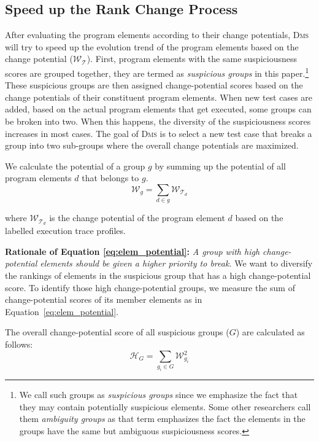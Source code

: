 \subsection{Speed up the Rank Change Process}

After evaluating the program elements according to their change potentials, \textsc{Dms} will try to speed up the evolution trend of the program elements based on the change potential ($\mathcal{W}_{\mathcal{T}}$). First, program elements with the same suspiciousness scores are grouped together, they are termed as {\em suspicious groups} in this paper.\footnote{We call such groups as {\em suspicious groups} since we emphasize the fact that they may contain potentially suspicious elements. Some other researchers \cite[e.g.][]{Alberto2011} call them {\em ambiguity groups} as that term emphasizes the fact the elements in the groups have the same but ambiguous suspiciousness scores.} These suspicious groups are then assigned change-potential scores based on the change potentials of their constituent program elements. When new test cases are added, based on the actual program elements that get executed, some groups can be broken into two. When this happens, the diversity of the suspiciousness scores increases in most cases. The goal of \textsc{Dms} is to select a new test case that breaks a group into two sub-groups where the overall change potentials are maximized.

We calculate the potential of a group $g$ by summing up the potential of all program elements $d$ that
belongs to $g$.
\begin{equation}
\label{eq:elem_potential}
	\mathcal{W}_{g} = \sum\limits_{d \in g}\mathcal{W}_{\mathcal{T}_{d}}
\end{equation}

\noindent
where $\mathcal{W}_{\mathcal{T}_d}$ is the change potential of the program element $d$ based on the labelled execution trace profiles.

\noindent\textbf{Rationale of Equation \ref{eq:elem_potential}:} \textit{A group with high change-potential elements should be given a higher priority to break.}
We want to diversify the rankings of elements in the suspicious group that has a high change-potential score. 
To identify those high change-potential groups, we measure the sum of change-potential scores of its member elements as in Equation~\ref{eq:elem_potential}.

The overall change-potential score of all suspicious groups ($G$) are calculated as follows:
\begin{equation}
	\mathcal{H}_G = \sum\limits_{g_{i} \in G}{ \mathcal{W}_{g_i}^{2} }\label{eq:groupset_potential}
\end{equation}

